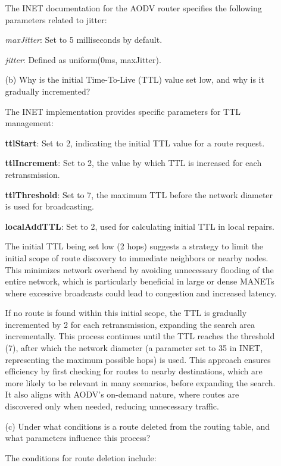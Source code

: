 \documentclass[a4paper]{article}
\begin{document}
\begin{enumerate}
\begin{itemize}
				The INET documentation for the AODV router specifies the following parameters related to jitter:
				
				\textit{maxJitter}: Set to 5 milliseconds by default.
				
				\textit{jitter}: Defined as uniform(0ms, maxJitter).
				
				\item[(b)] Why is the initial Time-To-Live (TTL) value set low, and why is it gradually incremented?
				
				The INET implementation provides specific parameters for TTL management:
				
				\textbf{ttlStart}: Set to 2, indicating the initial TTL value for a route request.
				
				\textbf{ttlIncrement}: Set to 2, the value by which TTL is increased for each retransmission.
				
				\textbf{ttlThreshold}: Set to 7, the maximum TTL before the network diameter is used for broadcasting.
				
				\textbf{localAddTTL}: Set to 2, used for calculating initial TTL in local repairs.
				
				The initial TTL being set low (2 hops) suggests a strategy to limit the initial scope of route discovery to immediate neighbors or nearby nodes. This minimizes network overhead by avoiding unnecessary flooding of the entire network, which is particularly beneficial in large or dense MANETs where excessive broadcasts could lead to congestion and increased latency.
				
				\pagebreak
				
				If no route is found within this initial scope, the TTL is gradually incremented by 2 for each retransmission, expanding the search area incrementally. This process continues until the TTL reaches the threshold (7), after which the network diameter (a parameter set to 35 in INET, representing the maximum possible hops) is used. This approach ensures efficiency by first checking for routes to nearby destinations, which are more likely to be relevant in many scenarios, before expanding the search. It also aligns with AODV’s on-demand nature, where routes are discovered only when needed, reducing unnecessary traffic.
				
				\item[(c)] Under what conditions is a route deleted from the routing table, and what parameters influence this process?
				
				The conditions for route deletion include:
				

\end{itemize}
\end{enumerate}
\end{document}
